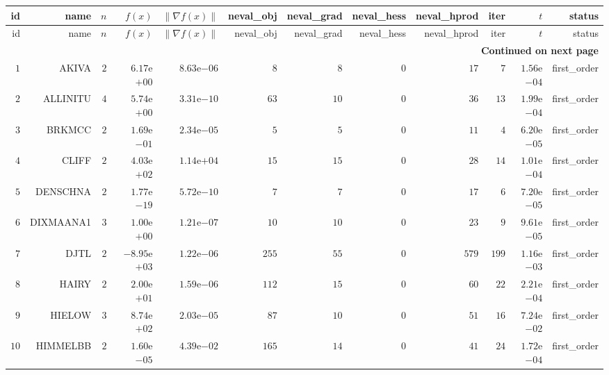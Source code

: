 \begin{longtable}{rrrrrrrrrrrr}
  \hline
  id & name & \(n\) & \(f(x)\) & \(\|\nabla f(x)\|\) & neval\_obj & neval\_grad & neval\_hess & neval\_hprod & iter & \(t\) & status \\\hline
  \endfirsthead
  \hline
  id & name & \(n\) & \(f(x)\) & \(\|\nabla f(x)\|\) & neval\_obj & neval\_grad & neval\_hess & neval\_hprod & iter & \(t\) & status \\\hline
  \endhead
  \hline
  \multicolumn{12}{r}{{\bfseries Continued on next page}}\\
  \hline
  \endfoot
  \endlastfoot
  \(     1\) & AKIVA & \(     2\) & \( 6.17\)e\(+00\) & \( 8.63\)e\(-06\) & \(     8\) & \(     8\) & \(     0\) & \(    17\) & \(     7\) & \( 1.56\)e\(-04\) & first\_order \\
  \(     2\) & ALLINITU & \(     4\) & \( 5.74\)e\(+00\) & \( 3.31\)e\(-10\) & \(    63\) & \(    10\) & \(     0\) & \(    36\) & \(    13\) & \( 1.99\)e\(-04\) & first\_order \\
  \(     3\) & BRKMCC & \(     2\) & \( 1.69\)e\(-01\) & \( 2.34\)e\(-05\) & \(     5\) & \(     5\) & \(     0\) & \(    11\) & \(     4\) & \( 6.20\)e\(-05\) & first\_order \\
  \(     4\) & CLIFF & \(     2\) & \( 4.03\)e\(+02\) & \( 1.14\)e\(+04\) & \(    15\) & \(    15\) & \(     0\) & \(    28\) & \(    14\) & \( 1.01\)e\(-04\) & first\_order \\
  \(     5\) & DENSCHNA & \(     2\) & \( 1.77\)e\(-19\) & \( 5.72\)e\(-10\) & \(     7\) & \(     7\) & \(     0\) & \(    17\) & \(     6\) & \( 7.20\)e\(-05\) & first\_order \\
  \(     6\) & DIXMAANA1 & \(     3\) & \( 1.00\)e\(+00\) & \( 1.21\)e\(-07\) & \(    10\) & \(    10\) & \(     0\) & \(    23\) & \(     9\) & \( 9.61\)e\(-05\) & first\_order \\
  \(     7\) & DJTL & \(     2\) & \(-8.95\)e\(+03\) & \( 1.22\)e\(-06\) & \(   255\) & \(    55\) & \(     0\) & \(   579\) & \(   199\) & \( 1.16\)e\(-03\) & first\_order \\
  \(     8\) & HAIRY & \(     2\) & \( 2.00\)e\(+01\) & \( 1.59\)e\(-06\) & \(   112\) & \(    15\) & \(     0\) & \(    60\) & \(    22\) & \( 2.21\)e\(-04\) & first\_order \\
  \(     9\) & HIELOW & \(     3\) & \( 8.74\)e\(+02\) & \( 2.03\)e\(-05\) & \(    87\) & \(    10\) & \(     0\) & \(    51\) & \(    16\) & \( 7.24\)e\(-02\) & first\_order \\
  \(    10\) & HIMMELBB & \(     2\) & \( 1.60\)e\(-05\) & \( 4.39\)e\(-02\) & \(   165\) & \(    14\) & \(     0\) & \(    41\) & \(    24\) & \( 1.72\)e\(-04\) & first\_order \\

\end{longtable}
